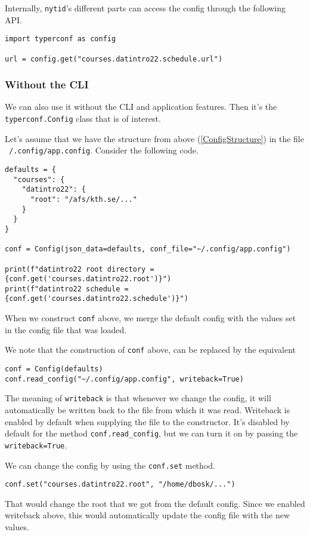 Internally, \texttt{nytid}'s different parts can access the config through the 
following API\@.
\begin{verbatim}
import typerconf as config

url = config.get("courses.datintro22.schedule.url")
\end{verbatim}

\subsubsection{Without the CLI}

We can also use it without the CLI and application features.
Then it's the \texttt{typerconf.Config} class that is of interest.

Let's assume that we have the structure from above (\cref{ConfigStructure}) in 
the file \texttt{~/.config/app.config}.
Consider the following code.
\begin{verbatim}
defaults = {
  "courses": {
    "datintro22": {
      "root": "/afs/kth.se/..."
    }
  }
}

conf = Config(json_data=defaults, conf_file="~/.config/app.config")

print(f"datintro22 root directory = {conf.get('courses.datintro22.root')}")
print(f"datintro22 schedule = {conf.get('courses.datintro22.schedule')}")
\end{verbatim}
When we construct \texttt{conf} above, we merge the default config 
with the values set in the config file that was loaded.

We note that the construction of \texttt{conf} above, can be 
replaced by the equivalent
\begin{verbatim}
conf = Config(defaults)
conf.read_config("~/.config/app.config", writeback=True)
\end{verbatim}
The meaning of \texttt{writeback} is that whenever we change the 
config, it will automatically be written back to the file from which it was 
read.
Writeback is enabled by default when supplying the file to the constructor.
It's disabled by default for the method \texttt{conf.read_config}, 
but we can turn it on by passing the \texttt{writeback=True}.

We can change the config by using the \texttt{conf.set} method.
\begin{verbatim}
conf.set("courses.datintro22.root", "/home/dbosk/...")
\end{verbatim}
That would change the root that we got from the default config.
Since we enabled writeback above, this would automatically update the config 
file with the new values.


